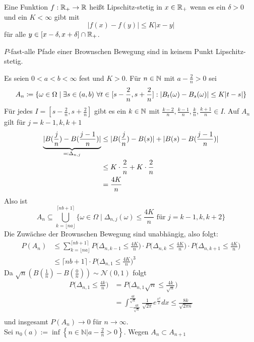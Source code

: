 \documentclass[a4paper,twoside,DIV15,BCOR12mm]{scrbook}
\begin{document}
\begin{definition}
Eine Funktion $f:\mathbb{R}_{+}\to \mathbb{R}$ heißt Lipschitz-stetig in $x\in\mathbb{R}_+$ wenn es ein $\delta>0$ und ein $K<\infty$ gibt mit
\[ |f(x)-f(y)| \le K|x-y|\]
für alle $y\in[x-\delta,x+\delta]\cap\mathbb{R}_+$.
\end{definition}

\begin{satz}
$P$-fast-alle Pfade einer Brownschen Bewegung sind in keinem Punkt Lipschitz-stetig.
\end{satz}
\begin{beweis}
Es seien $0<a<b<\infty$ fest und $K>0$. Für $n\in\mathbb{N}$ mit $a-\frac 2n>0$ sei 
\[
A_n \da \{\omega\in \Omega\mid \exists s\in (a,b)\ \forall t\in[s-\frac2n,s+\frac2n]: |B_t(\omega) - B_s(\omega)| \le K|t-s|\}
\]
Für jedes $I=[s-\frac2n,s+\frac2n]$ gibt es ein $k\in\mathbb{N}$ mit $\frac{k-2}n,\frac{k-1}n,\frac kn,\frac{k+1}n\in I$. Auf $A_n$ gilt für $j=k-1,k,k+1$
\begin{align*}
\underbrace{|B(\frac jn)-B(\frac {j-1}n)|}_{\ad \Delta_{n,j}} &\le | B(\frac jn) - B(s)| + |B(s) - B(\frac {j-1}n)| \\
&\le K\cdot \frac 2n + K\cdot \frac 2n\\
&= \frac{4K}n
\end{align*}
Also ist 
\[
A_n\subseteq \bigcup_{k=\lfloor na\rfloor}^{\lceil nb+1\rceil} \{\omega\in \Omega\mid \Delta_{n,j}(\omega) \le \frac{4K}n\text{ für }j=k-1,k,k+2\}
\]
Die Zuwächse der Brownschen Bewegung sind unabhängig, also folgt:
\begin{align*}
P(A_n) &\le \sum_{k=\lfloor na\rfloor}^{\lceil nb+1\rceil} P\Big(\Delta_{n,k-1}\le \frac{4K}n\Big)\cdot P\Big(\Delta_{n,k}\le \frac{4K}n\Big)\cdot P\Big(\Delta_{n,k+1}\le \frac{4K}n\Big) \\
&\le {\lceil nb+1\rceil}\cdot P\Big(\Delta_{n,1}\le \frac{4K}n\Big)^3
\end{align*}
Da $\sqrt{n}(B(\frac{1}{n})-B(\frac{0}{n}))\sim\mathcal N(0,1)$ folgt
\begin{align*}
  P\Big(\Delta_{n,1}\leq\frac{4k}{n}\Big) &=P\Big(\Delta_{n,1}\sqrt{n}\leq\frac{4k}{\sqrt{n}}\Big) \\
  &=\int_{-\frac{4k}{\sqrt{n}}}^{\frac{4k}{\sqrt{n}}}\frac{1}{\sqrt{2\pi}}e^{\frac{x^2}{2}}dx\leq\frac{8k}{\sqrt{2\pi n}} \\
\end{align*}
und insgesamt $P(A_n)\longrightarrow 0$ für $n\longrightarrow\infty$. \\
Sei $n_0(a):=\inf\left\{n\in\mathbb N\vert a-\frac{2}{n} > 0\right\}$. Wegen $A_n\subset A_{n+1}$

\end{beweis}
\end{document}
